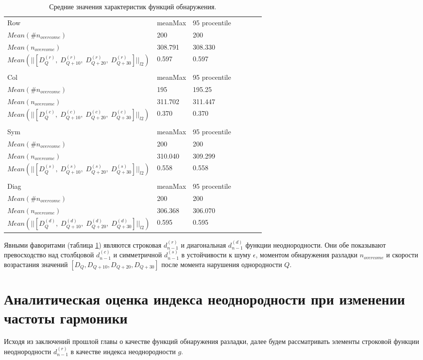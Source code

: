 \documentclass[specialist, substylefile = spbu.rtx,
			   subf, href, 12pt]{disser}
\begin{document}
\begin{table}[!hhh]
	\caption{Средние значения характеристик функций обнаружения.}
	\begin{tabular}{lllllll}
		Row & meanMax & 95 procentile \\
		$Mean(\#n_{overcome})$ & 200 & 200 \\
		$Mean(n_{overcome})$ & 308.791 & 308.330 \\
		$Mean(||[D_Q^{(r)},\; D_{Q+10}^{(r)},\; D_{Q+20}^{(r)},\; D_{Q+30}^{(r)}]||_{l2})$ & 0.597 & 0.597 \\
		&  &  \\
		Col & meanMax & 95 procentile \\
		$Mean(\#n_{overcome})$ & 195 & 195.25 \\
		$Mean(n_{overcome})$ & 311.702 & 311.447 \\
		$Mean(||[D_Q^{(c)},\; D_{Q+10}^{(c)},\; D_{Q+20}^{(c)},\; D_{Q+30}^{(c)}]||_{l2})$ & 0.370 & 0.370 \\
		&  &  \\
		Sym & meanMax & 95 procentile \\
		$Mean(\#n_{overcome})$ & 200 & 200 \\
		$Mean(n_{overcome})$ & 310.040 & 309.299 \\
		$Mean(||[D_Q^{(s)},\; D_{Q+10}^{(s)},\; D_{Q+20}^{(s)},\; D_{Q+30}^{(s)}]||_{l2})$ & 0.558 & 0.558 \\
		&  &  \\
		Diag & meanMax & 95 procentile \\
		$Mean(\#n_{overcome})$ & 200 & 200 \\
		$Mean(n_{overcome})$ & 306.368 & 306.070 \\
		$Mean(||[D_Q^{(d)},\; D_{Q+10}^{(d)},\; D_{Q+20}^{(d)},\; D_{Q+30}^{(d)}]||_{l2})$ & 0.595 & 0.595
	\end{tabular}
	\label{tab:AvgResultsNoise}
\end{table}

Явными фаворитами (таблица \ref{tab:AvgResultsNoise}) являются строковая $d_{n-1}^{(r)}$ и диагональная $d_{n-1}^{(d)}$ функции неоднородности. Они обе показывают превосходство над столбцовой $d_{n-1}^{(c)}$ и симметричной $d_{n-1}^{(s)}$ в устойчивости к шуму $\epsilon$, моментом обнаружения разладки $n_{overcome}$ и скорости возрастания значений $[D_Q, D_{Q+10}, D_{Q+20}, D_{Q+30}]$ после момента нарушения однородности $Q$.


\newpage
\chapter{Аналитическая оценка индекса неоднородности при изменении частоты гармоники}
Исходя из заключений прошлой главы о качестве функций обнаружения разладки, далее будем рассматривать элементы строковой функции неоднородности $d_{n-1}^{(r)}$ в качестве индекса неоднородности $ g $.
\end{document}
